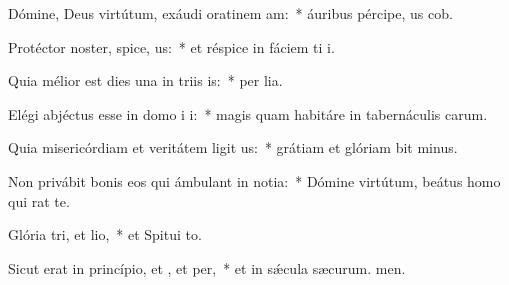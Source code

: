 \item Dómine, Deus virtútum, exáudi oratinem am:~* áuribus pércipe, us cob.
\item Protéctor noster, spice, us:~* et réspice in fáciem ti i.
\item Quia mélior est dies una in triis is:~* per lia.
\item Elégi abjéctus esse in domo i i:~* magis quam habitáre in tabernáculis carum.
\item Quia misericórdiam et veritátem ligit us:~* grátiam et glóriam bit minus.
\item Non privábit bonis eos qui ámbulant in notia:~* Dómine virtútum, beátus homo qui rat  te.
\item Glória tri, et lio,~* et Spitui to.
\item Sicut erat in princípio, et , et per,~* et in sǽcula sæcurum. men.
